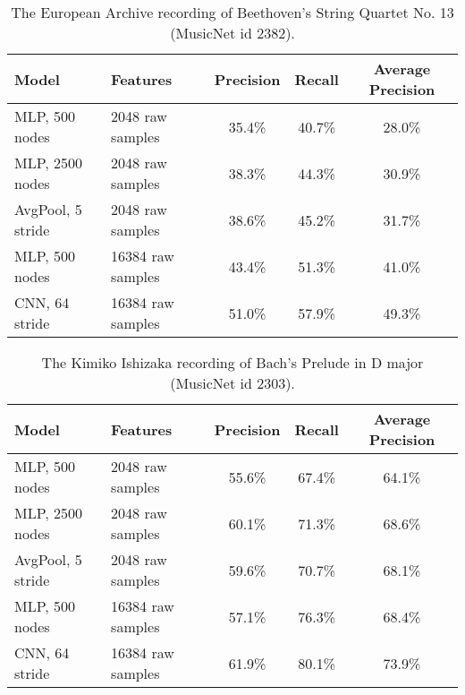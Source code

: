 \documentclass{article} \usepackage{iclr2017_conference,times}
\begin{document}
\begin{table}[h]
  \centering
  \begin{tabular}{llccc}
    \toprule
    \cmidrule{1-5}
    Model & Features & Precision & Recall & Average Precision \\
    \midrule
    MLP, 500 nodes & 2048 raw samples & 35.4\% & 40.7\% & 28.0\% \\
    MLP, 2500 nodes & 2048 raw samples & 38.3\% & 44.3\% & 30.9\% \\
    AvgPool, 5 stride & 2048 raw samples & 38.6\% & 45.2\% & 31.7\% \\
    MLP, 500 nodes & 16384 raw samples & 43.4\% & 51.3\% & 41.0\% \\
    CNN, 64 stride & 16384 raw samples & 51.0\% & 57.9\% & 49.3\% \\
    \bottomrule
  \end{tabular}
  \caption{The European Archive recording of Beethoven's String Quartet No. 13 (MusicNet id 2382).}
\end{table}

\begin{table}[h]
  \centering
  \begin{tabular}{llccc}
    \toprule
    \cmidrule{1-5}
    Model & Features & Precision & Recall & Average Precision \\
    \midrule
    MLP, 500 nodes & 2048 raw samples & 55.6\% & 67.4\% & 64.1\% \\
    MLP, 2500 nodes & 2048 raw samples & 60.1\% & 71.3\% & 68.6\% \\
    AvgPool, 5 stride & 2048 raw samples & 59.6\% & 70.7\% & 68.1\% \\
    MLP, 500 nodes & 16384 raw samples & 57.1\% & 76.3\% & 68.4\% \\
    CNN, 64 stride & 16384 raw samples & 61.9\% & 80.1\% & 73.9\% \\
    \bottomrule
  \end{tabular}
  \caption{The Kimiko Ishizaka recording of Bach's Prelude in D major (MusicNet id 2303).}
\end{table}
 
\end{document}
